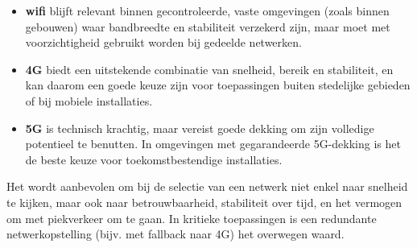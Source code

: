 \begin{itemize}
    \item \textbf{wifi} blijft relevant binnen gecontroleerde, vaste omgevingen (zoals binnen gebouwen) waar bandbreedte en stabiliteit verzekerd zijn, maar moet met voorzichtigheid gebruikt worden bij gedeelde netwerken.
    \item \textbf{4G} biedt een uitstekende combinatie van snelheid, bereik en stabiliteit, en kan daarom een goede keuze zijn voor toepassingen buiten stedelijke gebieden of bij mobiele installaties.
    \item \textbf{5G} is technisch krachtig, maar vereist goede dekking om zijn volledige potentieel te benutten. In omgevingen met gegarandeerde 5G-dekking is het de beste keuze voor toekomstbestendige installaties.
    
\end{itemize}

Het wordt aanbevolen om bij de selectie van een netwerk niet enkel naar snelheid te kijken, maar ook naar betrouwbaarheid, stabiliteit over tijd, en het vermogen om met piekverkeer om te gaan. In kritieke toepassingen is een redundante netwerkopstelling (bijv. met fallback naar 4G) het overwegen waard.





